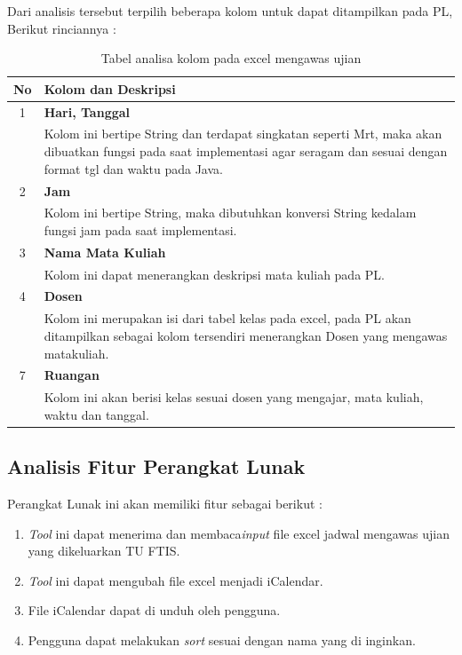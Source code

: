 Dari analisis tersebut terpilih beberapa kolom untuk dapat ditampilkan pada PL, Berikut rinciannya :
\begin{table}[H]
		\centering
		\caption{Tabel analisa kolom pada excel mengawas ujian}
		\label{tab:analisa_kolom}
\begin{tabular}{|c|p{12cm}|}
		\hline
		\textbf{No} & \textbf{Kolom dan Deskripsi} \\ \hline \hline
		1 & \textbf{Hari, Tanggal}\\
			&	Kolom ini bertipe String dan terdapat singkatan seperti Mrt, maka akan dibuatkan fungsi pada saat implementasi agar seragam dan sesuai dengan format tgl dan waktu pada Java.\\ \hline	
		2 & \textbf{Jam}\\
			&	Kolom ini bertipe String, maka dibutuhkan konversi String kedalam fungsi jam pada saat implementasi.\\ \hline
		3 & \textbf{Nama Mata Kuliah}\\
			&	Kolom ini dapat menerangkan deskripsi mata kuliah pada PL.\\ \hline
		4 & \textbf{Dosen}\\
			&	Kolom ini merupakan isi dari tabel kelas pada excel, pada PL akan ditampilkan sebagai kolom tersendiri menerangkan Dosen yang mengawas matakuliah.\\ \hline		
		7 & \textbf{Ruangan}\\
			&	Kolom ini akan berisi kelas sesuai dosen yang mengajar, mata kuliah, waktu dan tanggal.\\ \hline
	\end{tabular}
\end{table}

\subsection{Analisis Fitur Perangkat Lunak}
Perangkat Lunak ini akan memiliki fitur sebagai berikut : 
	\begin{enumerate}
		\item \textit{Tool} ini dapat menerima dan membaca\textit{input} file excel jadwal mengawas ujian yang dikeluarkan TU FTIS.
		\item \textit{Tool} ini dapat mengubah file excel menjadi iCalendar.
		\item File iCalendar dapat di unduh oleh pengguna.
		\item Pengguna dapat melakukan \textit{sort} sesuai dengan nama yang di inginkan.
	\end{enumerate}
	
